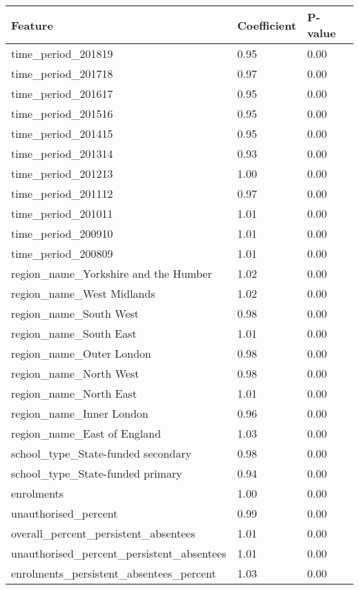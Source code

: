 \documentclass{article}
\begin{document}
\begin{longtable}{|p{}|p{}|p{}|}
    
        \hline
        \textbf{Feature} & \textbf{Coefficient} & \textbf{P-value} \\  
        \hline
        \endfirsthead

        time\_period\_201819 & 0.95 & 0.00 \\
        time\_period\_201718 & 0.97 & 0.00 \\
        time\_period\_201617 & 0.95 & 0.00 \\
        time\_period\_201516 & 0.95 & 0.00 \\
        time\_period\_201415 & 0.95 & 0.00 \\
        time\_period\_201314 & 0.93 & 0.00 \\
        time\_period\_201213 & 1.00 & 0.00 \\
        time\_period\_201112 & 0.97 & 0.00 \\
        time\_period\_201011 & 1.01 & 0.00 \\
        time\_period\_200910 & 1.01 & 0.00 \\
        time\_period\_200809 & 1.01 & 0.00 \\
        \hline

        region\_name\_Yorkshire and the Humber & 1.02 & 0.00 \\
        region\_name\_West Midlands & 1.02 & 0.00 \\
        region\_name\_South West & 0.98 & 0.00 \\
        region\_name\_South East & 1.01 & 0.00 \\
        region\_name\_Outer London & 0.98 & 0.00 \\
        region\_name\_North West & 0.98 & 0.00 \\
        region\_name\_North East & 1.01 & 0.00 \\
        region\_name\_Inner London & 0.96 & 0.00 \\
        region\_name\_East of England & 1.03 & 0.00 \\
        \hline

        school\_type\_State-funded secondary & 0.98 & 0.00 \\
        school\_type\_State-funded primary & 0.94 & 0.00 \\
        \hline

        enrolments & 1.00 & 0.00 \\
        unauthorised\_percent & 0.99 & 0.00 \\
        overall\_percent\_persistent\_absentees & 1.01 & 0.00 \\
        unauthorised\_percent\_persistent\_absentees & 1.01 & 0.00 \\
        enrolments\_persistent\_absentees\_percent & 1.03 & 0.00 \\
        \hline


\end{longtable}
\end{document}
